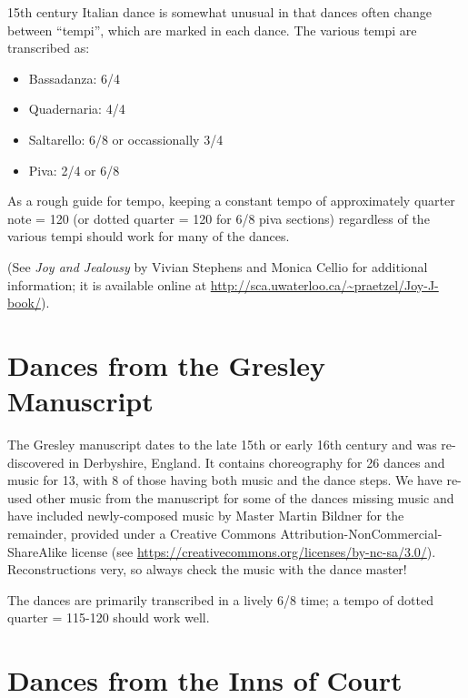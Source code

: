 \documentclass[11pt]{book}
\begin{document}
15th century Italian dance is somewhat unusual in that dances often change
between ``tempi'', which are marked in each dance. The various tempi are
transcribed as:

\begin{itemize}

\item Bassadanza: 6/4
\item Quadernaria: 4/4
\item Saltarello: 6/8 or occassionally 3/4
\item Piva: 2/4 or 6/8

\end{itemize}

As a rough guide for tempo, keeping a constant tempo of approximately quarter
note = 120 (or dotted quarter = 120 for 6/8 piva sections) regardless of the
various tempi should work for many of the dances.

(See {\em Joy and Jealousy} by Vivian Stephens and Monica Cellio for additional
information; it is available online at
\url{http://sca.uwaterloo.ca/~praetzel/Joy-J-book/}). 


\clearpage


\chapter{Dances from the Gresley Manuscript}

The Gresley manuscript dates to the late 15th or early 16th century and was
re-discovered in Derbyshire, England. It contains choreography for 26 dances
and music for 13, with 8 of those having both music and the dance steps. We
have re-used other music from the manuscript for some of the dances missing
music and have included newly-composed music by Master Martin Bildner for the remainder, provided
under a Creative Commons Attribution-NonCommercial-ShareAlike license (see 
\url{https://creativecommons.org/licenses/by-nc-sa/3.0/}).
Reconstructions very, so always check the music with the dance master!

The dances are primarily transcribed in a lively 6/8 time; a tempo of dotted
quarter = 115-120 should work well.

\clearpage


\chapter{Dances from the Inns of Court}
\end{document}
